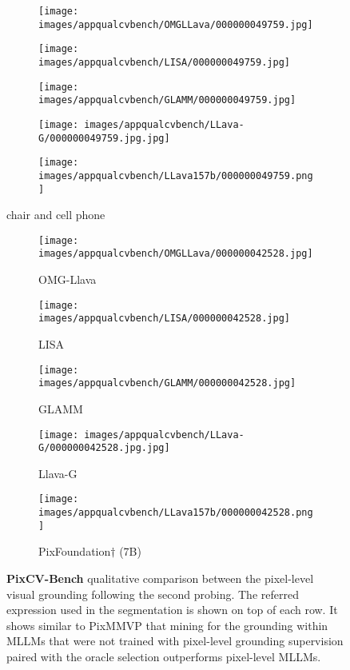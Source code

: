 \begin{figure*}[t]
\begin{subfigure}{0.19\textwidth}
\texttt{[image: images/appqualcvbench/OMGLLava/000000049759.jpg]}
\end{subfigure}%
\begin{subfigure}{0.19\textwidth}
\texttt{[image: images/appqualcvbench/LISA/000000049759.jpg]}
\end{subfigure}%
\begin{subfigure}{0.19\textwidth}
\texttt{[image: images/appqualcvbench/GLAMM/000000049759.jpg]}
\end{subfigure}%
\begin{subfigure}{0.19\textwidth}
\texttt{[image: images/appqualcvbench/LLava-G/000000049759.jpg.jpg]}
\end{subfigure}%
\begin{subfigure}{0.19\textwidth}
\texttt{[image: images/appqualcvbench/LLava157b/000000049759.png]}
\end{subfigure}

chair and cell phone

\begin{subfigure}{0.19\textwidth}
\texttt{[image: images/appqualcvbench/OMGLLava/000000042528.jpg]}
\caption{OMG-Llava}
\end{subfigure}%
\begin{subfigure}{0.19\textwidth}
\texttt{[image: images/appqualcvbench/LISA/000000042528.jpg]}
\caption{LISA}
\end{subfigure}%
\begin{subfigure}{0.19\textwidth}
\texttt{[image: images/appqualcvbench/GLAMM/000000042528.jpg]}
\caption{GLAMM}
\end{subfigure}%
\begin{subfigure}{0.19\textwidth}
\texttt{[image: images/appqualcvbench/LLava-G/000000042528.jpg.jpg]}
\caption{Llava-G}
\end{subfigure}%
\begin{subfigure}{0.19\textwidth}
\texttt{[image: images/appqualcvbench/LLava157b/000000042528.png]}
\caption{PixFoundation$\dagger$ (7B)}
\end{subfigure}
\caption{\textbf{PixCV-Bench} qualitative comparison between the pixel-level visual grounding following the second probing. The referred expression used in the segmentation is shown on top of each row. It shows similar to PixMMVP that mining for the grounding within MLLMs that were not trained with pixel-level grounding supervision paired with the oracle selection outperforms pixel-level MLLMs.}
\label{fig:app_pixcvbench}
\end{figure*}


